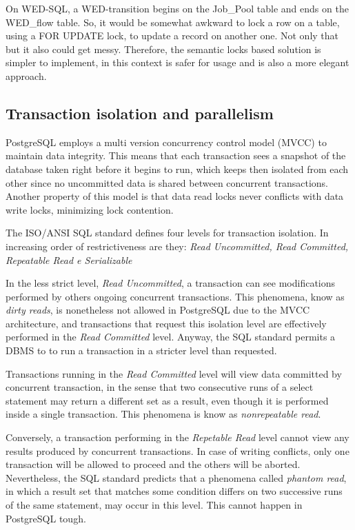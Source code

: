\documentclass[12pt]{article}
\begin{document}
\par On WED-SQL, a WED-transition begins on the Job\_Pool table and ends on the WED\_flow table. So, it would be somewhat
awkward to lock a row on a table, using a FOR UPDATE lock, to update a record on another one. Not only that but it also 
could get messy. Therefore, the semantic locks based solution is simpler to implement, in this context is safer for usage 
and is also a more elegant approach.   


\subsection{Transaction isolation and parallelism }

PostgreSQL employs a multi version concurrency control model (MVCC) to maintain data integrity. This means that each transaction
sees a snapshot of the database taken right before it begins to run, which keeps then isolated from each other since no uncommitted 
data is shared between concurrent transactions. Another property of this model is that data read locks never conflicts with
data write locks, minimizing lock contention.

\par The ISO/ANSI SQL standard defines four levels for transaction isolation. In increasing order of restrictiveness are they: 
\emph{Read Uncommitted, Read Committed, Repeatable Read e Serializable}

\par In the less strict level, \emph{Read Uncommitted}, a transaction can see modifications performed by others ongoing 
concurrent transactions. This phenomena, know as \emph{dirty reads}, is nonetheless not allowed in PostgreSQL due to the
MVCC architecture, and transactions that request this isolation level are effectively performed in the \emph{Read Committed}
level. Anyway, the SQL standard permits a DBMS to to run a transaction in a stricter level than requested.

\par Transactions running in the \emph{Read Committed} level will view data committed by concurrent transaction, in the sense that
two consecutive runs of a select statement may return a different set as a result, even though it is performed inside a 
single transaction. This phenomena is know as \emph{nonrepeatable read}.

\par Conversely, a transaction performing in the \emph{Repetable Read} level cannot view any results produced by concurrent
transactions. In case of writing conflicts, only one transaction will be allowed to proceed and the others will be aborted.
Nevertheless, the SQL standard predicts that a phenomena called \emph{phantom read}, in which a result set that matches some
condition differs on two successive runs of the same statement, may occur in this level. This cannot happen in PostgreSQL tough.
\end{document}
